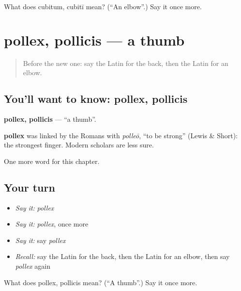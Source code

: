 \begin{tcolorbox}[breakable,colback=teal!4,colframe=teal!35!black,title={Before you move on}]
What does cubitum, cubitī mean? (\textquotedblleft{}An elbow\textquotedblright{}.) Say it once more.
\end{tcolorbox}
\section[pollex, pollicis]{pollex, pollicis — a thumb}

\label{lesson:LA-C136-pollex}



\begin{quote}
Before the new one: say the Latin for the back, then the Latin for an elbow.
\end{quote}

\subsection*{You'll want to know: pollex, pollicis}
\textbf{pollex, pollicis} — \textquotedblleft{}a thumb\textquotedblright{}.

\begin{cousinweb}
\textbf{pollex} was linked by the Romans with \emph{polleō}, \textquotedblleft{}to be strong\textquotedblright{} (Lewis \& Short): the strongest finger. Modern scholars are less sure.
\end{cousinweb}

\begin{grammarlens}[title={What you've built}]
One more word for this chapter.
\end{grammarlens}

\subsection*{Your turn}
\begin{itemize}
\raggedright
  \item \emph{Say it:} \emph{pollex}
  \item \emph{Say it:} \emph{pollex}, once more
  \item \emph{Say it:} say \emph{pollex}
  \item \emph{Recall:} say the Latin for the back, then the Latin for an elbow, then say \emph{pollex} again
\end{itemize}

\begin{tcolorbox}[breakable,colback=teal!4,colframe=teal!35!black,title={Before you move on}]
What does pollex, pollicis mean? (\textquotedblleft{}A thumb\textquotedblright{}.) Say it once more.
\end{tcolorbox}
